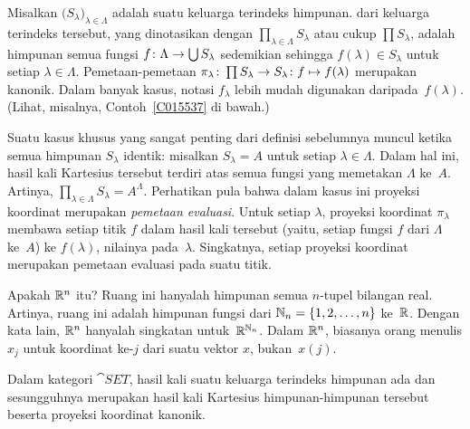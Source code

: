 \begin{defn}\label{C015531} Misalkan $\bigl(S_\lambda\bigr)_{\lambda \in \Lambda}$ adalah suatu keluarga
terindeks himpunan.
 dari keluarga terindeks tersebut, yang dinotasikan dengan
$\prod_{\lambda \in \Lambda} S_\lambda$ atau cukup $\prod S_\lambda$, adalah himpunan semua
fungsi $f \colon \Lambda \rightarrow \bigcup S_\lambda$ sedemikian sehingga $f(\lambda) \in S_\lambda$
untuk setiap $\lambda \in \Lambda$. Pemetaan-pemetaan $\pi_\lambda \colon \prod S_\lambda \rightarrow
S_\lambda \colon f \mapsto f(\lambda)$ merupakan
 kanonik. Dalam banyak kasus, notasi $f_\lambda$ lebih mudah digunakan
daripada~$f(\lambda)$. (Lihat, misalnya, Contoh~\ref{C015537} di bawah.)
\end{defn}

\begin{exam}\label{C015534} Suatu kasus khusus yang sangat penting dari definisi sebelumnya muncul
ketika semua himpunan $S_\lambda$ identik: misalkan $S_\lambda = A$ untuk setiap $\lambda
\in \Lambda$. Dalam hal ini, hasil kali Kartesius tersebut terdiri atas semua fungsi yang memetakan
$\Lambda$ ke~$A$. Artinya, $\prod_{\lambda \in \Lambda} S_\lambda = A^\Lambda$. Perhatikan
pula bahwa dalam kasus ini proyeksi koordinat merupakan
\emph{pemetaan evaluasi}. Untuk setiap $\lambda$, proyeksi koordinat $\pi_\lambda$ membawa
setiap titik $f$ dalam hasil kali tersebut (yaitu, setiap fungsi $f$ dari $\Lambda$ ke~$A$) ke
$f(\lambda)$, nilainya pada~$\lambda$. Singkatnya, setiap proyeksi koordinat merupakan
pemetaan evaluasi pada suatu titik.
\end{exam}

\begin{exam}\label{C015537} Apakah $\mathbb{R}^n$ itu? Ruang ini hanyalah himpunan semua $n$-tupel bilangan real.
Artinya, ruang ini adalah himpunan fungsi dari $\mathbb{N}_n = \{1,2,\dots,n\}$ ke~$\mathbb{R}$. Dengan
kata lain, $\mathbb{R}^n$ hanyalah singkatan untuk~$\mathbb{R}^{\mathbb{N}_n}$. Dalam $\mathbb{R}^n$, biasanya orang menulis $x_j$ untuk
koordinat ke-$j$ dari suatu vektor $x$, bukan~$x(j)$.
\end{exam}

\begin{exam} Dalam kategori $\cat{SET}$,
hasil kali suatu keluarga terindeks himpunan ada dan sesungguhnya merupakan hasil kali Kartesius himpunan-himpunan
tersebut beserta proyeksi koordinat kanonik.
\end{exam}

